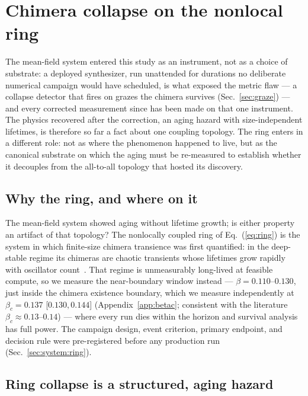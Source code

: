 \documentclass[pdflatex,sn-mathphys,Numbered]{sn-jnl}
\begin{document}
\section{Chimera collapse on the nonlocal ring}\label{sec:ring}

The mean-field system entered this study as an instrument, not as a choice of
substrate: a deployed synthesizer, run unattended for durations no deliberate
numerical campaign would have scheduled, is what exposed the metric flaw --- a
collapse detector that fires on grazes the chimera survives
(Sec.~\ref{sec:graze}) --- and every corrected measurement since has been made
on that one instrument. The physics recovered after the correction, an aging
hazard with size-independent lifetimes, is therefore so far a fact about one
coupling topology. The ring enters in a different role: not as where the
phenomenon happened to live, but as the canonical substrate on which the aging
must be re-measured to establish whether it decouples from the all-to-all
topology that hosted its discovery.

\subsection{Why the ring, and where on it}

The mean-field system showed aging without lifetime growth; is either property an
artifact of that topology? The nonlocally coupled ring of
Eq.~(\ref{eq:ring}) is the system in which finite-size chimera transience was
first quantified: in the deep-stable regime its chimeras are chaotic transients
whose lifetimes grow rapidly with oscillator count~\cite{wo2011}. That regime is
unmeasurably long-lived at feasible compute, so we measure the near-boundary
window instead --- $\beta = 0.110$--$0.130$, just inside the chimera existence
boundary, which we measure independently at $\beta_c = 0.137$ [$0.130, 0.144$]
(Appendix~\ref{app:betac}; consistent with the literature
$\beta_c \approx 0.13$--$0.14$) --- where every run dies within the
horizon and survival analysis has full power. The campaign design, event
criterion, primary endpoint, and decision rule were pre-registered before any
production run (Sec.~\ref{sec:system:ring}).

\subsection{Ring collapse is a structured, aging hazard}
\end{document}
